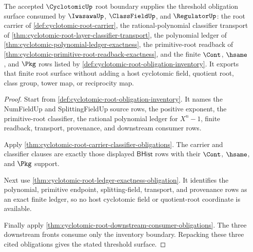 \begin{theorem}
\label{thm:cyclotomic-root-obligation-threshold}
The accepted $\CyclotomicUp$ root boundary supplies the threshold obligation
surface consumed by $\IwasawaUp$, $\ClassFieldUp$, and $\RegulatorUp$: the root
carrier of \autoref{def:cyclotomic-root-carrier}, the rational-polynomial
classifier transport of
\autoref{thm:cyclotomic-root-layer-classifier-transport}, the polynomial ledger
of \autoref{thm:cyclotomic-polynomial-ledger-exactness}, the primitive-root
readback of \autoref{thm:cyclotomic-primitive-root-readback-exactness}, and the
finite $\Cont$, $\hsame$, and $\Pkg$ rows listed by
\autoref{def:cyclotomic-root-obligation-inventory}. It exports that finite root
surface without adding a host cyclotomic field, quotient root, class group,
tower map, or reciprocity map.
\end{theorem}
\begin{proof}
Start from \autoref{def:cyclotomic-root-obligation-inventory}. It names the
NumFieldUp and SplittingFieldUp source rows, the positive exponent, the
primitive-root classifier, the rational polynomial ledger for $X^n-1$, finite
readback, transport, provenance, and downstream consumer rows.

Apply \autoref{thm:cyclotomic-root-carrier-classifier-obligations}. The carrier
and classifier clauses are exactly those displayed $\mathsf{BHist}$ rows with
their $\Cont$, $\hsame$, and $\Pkg$ support.

Next use \autoref{thm:cyclotomic-root-ledger-exactness-obligation}. It identifies
the polynomial, primitive endpoint, splitting-field, transport, and provenance
rows as an exact finite ledger, so no host cyclotomic field or quotient-root
coordinate is available.

Finally apply \autoref{thm:cyclotomic-root-downstream-consumer-obligations}.
The three downstream fronts consume only the inventory boundary. Repacking these
three cited obligations gives the stated threshold surface.
\end{proof}

